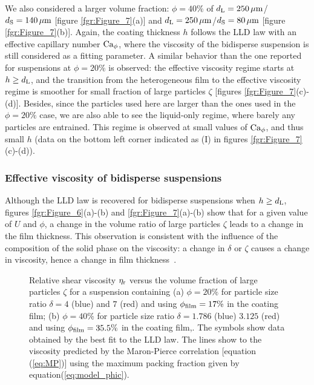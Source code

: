 \documentclass{jfm}
\begin{document}
We also considered a larger volume fraction: $\phi=40\%$ of $d_{\rm L}=250\,\mu{\rm m}$/$d_{\rm S}=140\,\mu{\rm m}$ [figure \ref{fgr:Figure_7}(a)] and $d_{\rm L}=250\,\mu{\rm m}$/$d_{\rm S}=80\,\mu{\rm m}$ [figure \ref{fgr:Figure_7}(b)]. Again, the coating thickness $h$ follows the LLD law with an effective capillary number ${\rm Ca}_\phi$, where the viscosity of the bidisperse suspension is still considered as a fitting parameter. A similar behavior than the one reported for suspensions at $\phi=20\%$ is observed:  the effective viscosity regime starts at $h \geq d_{\rm L}$, and the transition from the heterogeneous film to the effective viscosity regime is smoother  for small fraction of large particles $\zeta$ [figures \ref{fgr:Figure_7}(c)-(d)]. Besides, since the particles used here are larger than the ones used in the $\phi=20\%$ case, we are also able to see the liquid-only regime, where barely any particles are entrained. This regime is observed at small values of ${\rm Ca}_\phi$, and thus small $h$ (data on the bottom left corner indicated as (I) in figures \ref{fgr:Figure_7}(c)-(d)).

 \subsubsection{Effective viscosity of bidisperse suspensions}
 
Although the LLD law is recovered for bidisperse suspensions when $h\geq d_{\rm L}$, figures \ref{fgr:Figure_6}(a)-(b) and \ref{fgr:Figure_7}(a)-(b) show that for a given value of $U$ and $\phi$, a change in the volume ratio of large particles $\zeta$ leads to a change in the film thickness. This observation is consistent with the influence of the composition of the solid phase on the viscosity: a change in $\delta$ or $\zeta$ causes a change in viscosity, hence a change in film thickness~\cite[][]{shapiro1992random,gamonpilas2016shear,thievenaz2021droplet}.

\begin{figure}
\centering
{}
\caption{Relative shear viscosity $\eta_{\rm r}$ versus the volume fraction of large particles
    $\zeta$ for a suspension containing 
    (a) $\phi=20\%$ for particle size ratio $\delta=4$ (blue) and $7$ (red) 
    and using $\phi_{\rm film}=17\%$ in the coating film; 
    (b) $\phi=40\%$ for particle size ratio $\delta=1.786$ (blue) $3.125$ (red)
    and using $\phi_{\rm film}=35.5\%$ in the coating film,.
    The symbols show data obtained by the best fit to the LLD law.
    The lines show to the viscosity predicted by the Maron-Pierce correlation [equation (\ref{eq:MP})]
    using the maximum packing fraction given by equation(\ref{eq:model_phic}).}
  \label{fgr:Figure_8}
\end{figure}
\end{document}
